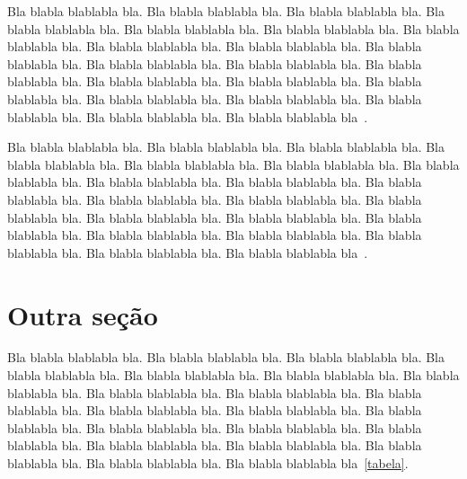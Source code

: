 \documentclass[diss,capa]{texufpel}
\begin{document}
Bla blabla blablabla bla.  Bla blabla blablabla bla.  Bla blabla
blablabla bla.  Bla blabla blablabla bla.  Bla blabla blablabla bla.
Bla blabla blablabla bla.  Bla blabla blablabla bla.  Bla blabla
blablabla bla.  Bla blabla blablabla bla.  Bla blabla blablabla bla.
Bla blabla blablabla bla.  Bla blabla blablabla bla.  Bla blabla
blablabla bla.  Bla blabla blablabla bla.  Bla blabla blablabla bla.
Bla blabla blablabla bla.  Bla blabla blablabla bla.  Bla blabla
blablabla bla.  Bla blabla blablabla bla.  Bla blabla blablabla bla.
Bla blabla blablabla bla~\citet{Moore:1979:MAI,Aguiar:2005}.

Bla blabla blablabla bla.  Bla blabla blablabla bla.  Bla blabla
blablabla bla.  Bla blabla blablabla bla.  Bla blabla blablabla bla.
Bla blabla blablabla bla.  Bla blabla blablabla bla.  Bla blabla
blablabla bla.  Bla blabla blablabla bla.  Bla blabla blablabla bla.
Bla blabla blablabla bla.  Bla blabla blablabla bla.  Bla blabla
blablabla bla.  Bla blabla blablabla bla.  Bla blabla blablabla bla.
Bla blabla blablabla bla.  Bla blabla blablabla bla.  Bla blabla
blablabla bla.  Bla blabla blablabla bla.  Bla blabla blablabla bla.
Bla blabla blablabla bla~\cite{vonNeumann:1966:TSR}.

\section{Outra seção}

Bla blabla blablabla bla.  Bla blabla blablabla bla.  Bla blabla
blablabla bla.  Bla blabla blablabla bla.  Bla blabla blablabla bla.
Bla blabla blablabla bla.  Bla blabla blablabla bla.  Bla blabla
blablabla bla.  Bla blabla blablabla bla.  Bla blabla blablabla bla.
Bla blabla blablabla bla.  Bla blabla blablabla bla.  Bla blabla
blablabla bla.  Bla blabla blablabla bla.  Bla blabla blablabla bla.
Bla blabla blablabla bla.  Bla blabla blablabla bla.  Bla blabla
blablabla bla.  Bla blabla blablabla bla.  Bla blabla blablabla bla.
Bla blabla blablabla bla~\ref{tabela}.
\end{document}
